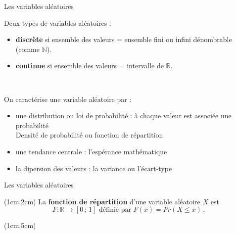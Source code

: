 \documentclass{beamer}
\newcommand{\N}{\mathbb{N}}
\begin{document}

\begin{frame}{Les variables aléatoires}

Deux types de variables aléatoires :
 \begin{itemize}
\item {\bf discrète} si ensemble des 
valeurs =  ensemble fini ou infini dénombrable (comme $\mathbb{\N}$).
\item  {\bf continue} si ensemble des valeurs = intervalle de $\mathbb{R}$.
\end{itemize}

\

On caractérise une variable aléatoire par :
 \begin{itemize}
\item une distribution ou loi de probabilité : à chaque valeur est associée une probabilité \\
Densité de probabilité ou fonction de répartition 
\item une tendance centrale : l'espérance mathématique 
\item la dipersion des valeurs : la variance ou l'écart-type
\end{itemize}

\end{frame}


\begin{frame}{Les variables aléatoires}
\begin{textblock*}{\textwidth}(1cm,2cm)
La {\bf fonction de répartition} d'une variable aléatoire $X$ est  
$$F:\mathbb{R}\longrightarrow [0\,;\,1]\mbox{ définie par
 }
F(x)=Pr(X\leq x)\,.
$$
\end{textblock*}


\begin{textblock*}{\textwidth}(1cm,5cm)


\end{textblock*}

\end{frame}
\end{document}
